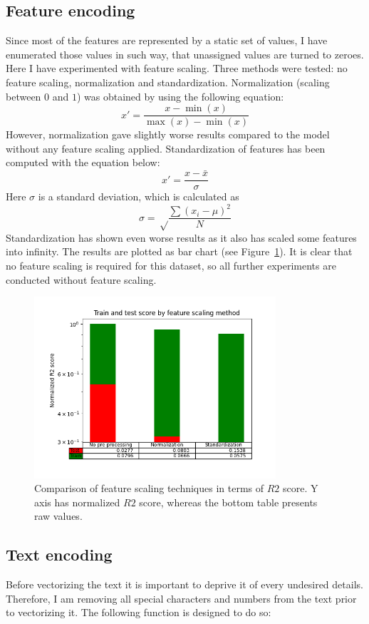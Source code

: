 \documentclass{article}
\begin{document}
\subsection{Feature encoding}
Since most of the features are represented by a static set of values, I have enumerated those values in such way,
that unassigned values are turned to zeroes. Here I have experimented with feature scaling. Three methods were tested:
no feature scaling, normalization and standardization. Normalization (scaling between $0$ and $1$) was obtained by
using the following equation:
\[ x' = \frac{x - \min (x)}{\max (x) - \min (x)} \]
However, normalization gave slightly worse results compared to the model without any feature scaling applied. 
Standardization of features has been computed with the equation below:
\[ x' = \frac{x - \bar x}{\sigma} \]
Here $\sigma$ is a standard deviation, which is calculated as
\[ \sigma = \sqrt \frac{\sum (x_i - \mu)^2}{N} \]
Standardization has shown even worse results as it also has scaled some features into infinity.
The results are plotted as bar chart (see Figure~\ref{fig:Figure_1}). It is clear that no feature scaling
is required for this dataset, so all further experiments are conducted without feature scaling.

\begin{figure}[h!]
    \centering
    \includegraphics[width=0.8\textwidth]{Figure_1.png}
    \caption{Comparison of feature scaling techniques in terms of $R2$ score. Y axis has normalized $R2$ score, 
    whereas the bottom table presents raw values.}\label{fig:Figure_1}
\end{figure}

\subsection{Text encoding}
Before vectorizing the text it is important to deprive it of every undesired details. Therefore, I am removing
all special characters and numbers from the text prior to vectorizing it. The following function is designed to do so:
\end{document}
